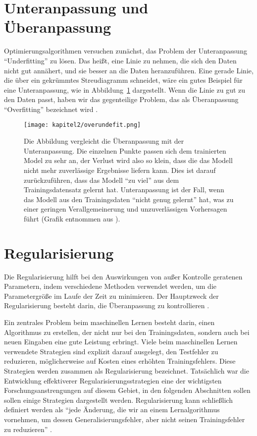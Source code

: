         \section{Unteranpassung und Überanpassung}
        Optimierungsalgorithmen versuchen zunächst, das Problem der Unteranpassung \enquote{Underfitting} zu lösen. Das heißt, eine Linie zu nehmen, die sich den Daten nicht gut annähert, und sie besser an die Daten heranzuführen. Eine gerade Linie, die über ein gekrümmtes Streudiagramm schneidet, wäre ein gutes Beispiel für eine Unteranpassung, wie in Abbildung~\ref{Kap2:OverUnder} dargestellt. Wenn die Linie zu gut zu den Daten passt, haben wir das gegenteilige Problem, das als Überanpassung \enquote{Overfitting} bezeichnet wird \cite*[27]{Patterson2019}.

        \begin{figure}[H]
            \centering
            \texttt{[image: kapitel2/overundefit.png]}
            \caption[Vergleich der Unteranpassung mit der Überanpassung]{Die Abbildung vergleicht die Überanpassung mit der Unteranpassung. Die einzelnen Punkte passen sich dem trainierten Model zu sehr an, der Verlust wird also so klein, dass die das Modell nicht mehr zuverlässige Ergebnisse liefern kann. Dies ist darauf zurückzuführen, dass das Modell \enquote{zu viel} aus dem Trainingsdatensatz gelernt hat. Unteranpassung ist der Fall, wenn das Modell aus den Trainingsdaten \enquote{nicht genug gelernt} hat, was zu einer geringen Verallgemeinerung und unzuverlässigen Vorhersagen führt (Grafik entnommen aus \cite*[27]{Patterson2019}). }
            \label{Kap2:OverUnder}
        \end{figure}

        \section{Regularisierung}
        Die Regularisierung hilft bei den Auswirkungen von außer Kontrolle geratenen Parametern, indem verschiedene Methoden verwendet werden, um die Parametergröße im Laufe der Zeit zu minimieren. Der Hauptzweck der Regularisierung besteht darin, die Überanpassung zu kontrollieren \cite*[79]{Patterson2019}.

        Ein zentrales Problem beim maschinellen Lernen besteht darin, einen Algorithmus zu erstellen, der nicht nur bei den Trainingsdaten, sondern auch bei neuen Eingaben eine gute Leistung erbringt. Viele beim maschinellen Lernen verwendete Strategien sind explizit darauf ausgelegt, den Testfehler zu reduzieren, möglicherweise auf Kosten eines erhöhten Trainingsfehlers. Diese Strategien werden zusammen als Regularisierung bezeichnet. Tatsächlich war die Entwicklung effektiverer Regularisierungsstrategien eine der wichtigsten Forschungsanstrengungen auf diesem Gebiet, in den folgenden Abschnitten sollen sollen einige Strategien dargestellt werden. Regularisierung kann schließlich definiert werden als \enquote{jede Änderung, die wir an einem Lernalgorithmus vornehmen, um dessen Generalisierungsfehler, aber nicht seinen Trainingsfehler zu reduzieren} \cite*[228]{IanGoodfellowYoshuaBengio2016}.

